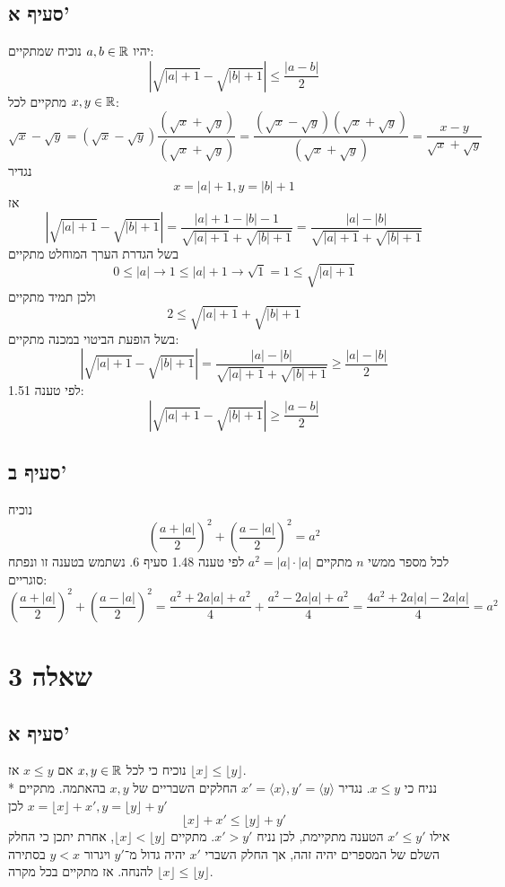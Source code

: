 \subsection{סעיף א'}
יהיו $a, b \in \mathbb{R}$ נוכיח שמתקיים:
\[
	\left| \sqrt{\left| a \right| + 1} - \sqrt{\left| b \right| + 1} \right| \le \frac{|a - b|}{2}
\]
מתקיים לכל $x, y \in \mathbb{R}$:
\[
	\sqrt{x} - \sqrt{y}
	= (\sqrt{x} - \sqrt{y}) \frac{(\sqrt{x} + \sqrt{y})}{(\sqrt{x} + \sqrt{y})}
	= \frac{(\sqrt{x} - \sqrt{y}) (\sqrt{x} + \sqrt{y})}{(\sqrt{x} + \sqrt{y})}
	= \frac{x - y}{\sqrt{x} + \sqrt{y}}
\]
נגדיר
\[
	x = |a| + 1, y = |b| + 1
\]
אז
\[
	\left| \sqrt{\left| a \right| + 1} - \sqrt{\left| b \right| + 1} \right|
	= \frac{|a| + 1 - |b| - 1}{\sqrt{\left| a \right| + 1} + \sqrt{\left| b \right| + 1}}
	= \frac{|a| - |b|}{\sqrt{\left| a \right| + 1} + \sqrt{\left| b \right| + 1}}
\]
בשל הגדרת הערך המוחלט מתקיים
\[
	0 \le |a| \rightarrow 1 \le |a| + 1 \rightarrow \sqrt{1} = 1 \le \sqrt{|a| + 1}
\]
ולכן תמיד מתקיים
\[
	2 \le \sqrt{\left| a \right| + 1} + \sqrt{\left| b \right| + 1}
\]
בשל הופעת הביטוי במכנה מתקיים:
\[
	\left| \sqrt{\left| a \right| + 1} - \sqrt{\left| b \right| + 1} \right| = 
	\frac{|a| - |b|}{\sqrt{\left| a \right| + 1} + \sqrt{\left| b \right| + 1}}
	\ge \frac{|a| - |b|}{2}
\]
לפי טענה 1.51:
\[
	\left| \sqrt{\left| a \right| + 1} - \sqrt{\left| b \right| + 1} \right|
	\ge \frac{|a - b|}{2}
\]

\subsection{סעיף ב'}
נוכיח
\[
	{\left( \frac{a + |a|}{2} \right)}^2
	+ {\left( \frac{a - |a|}{2} \right)}^2
	= a^2
\]
לכל מספר ממשי $n$ מתקיים $a^2 = |a| \cdot |a|$
לפי טענה 1.48 סעיף 6. נשתמש בטענה זו ונפתח סוגריים:
\[
	{\left( \frac{a + |a|}{2} \right)}^2
	+ {\left( \frac{a - |a|}{2} \right)}^2
	=
	\frac{a^2 + 2 a |a| + a^2}{4}
	+ \frac{a^2 - 2 a |a| + a^2}{4}
	=
	\frac{4 a^2 + 2 a |a| - 2 a |a|}{4}
	= a^2
\]

\section{שאלה 3}
\subsection{סעיף א'}
נוכיח כי לכל $x, y \in \mathbb{R}$ אם $x \le y$ אז $\lfloor x \rfloor \le \lfloor y \rfloor$. \\*
נניח כי $x \le y$. נגדיר $x' = \langle x \rangle, y' = \langle y \rangle$ החלקים השבריים של $x, y$ בהאתמה.
מתקיים $x = \lfloor x \rfloor + x', y = \lfloor y \rfloor + y'$ לכן
\[
	\lfloor x \rfloor + x' \le \lfloor y \rfloor + y'
\]
אילו $x' \le y'$ הטענה מתקיימת, לכן נניח $x' > y'$.
מתקיים $\lfloor x \rfloor < \lfloor y \rfloor$, אחרת יתכן כי החלק השלם של המספרים יהיה זהה, אך החלק השברי $x'$ יהיה גדול מ־$y'$ ויגרור $y < x$ בסתירה להנחה.
אז מתקיים בכל מקרה $\lfloor x \rfloor \le \lfloor y \rfloor$.


